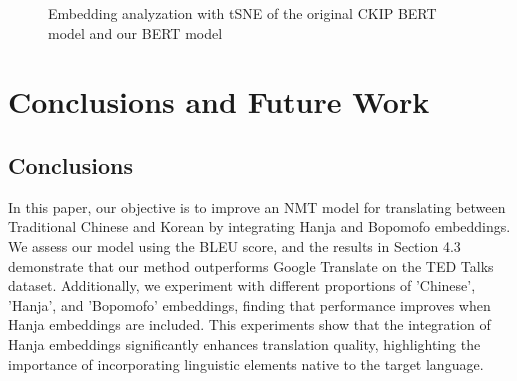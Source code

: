 \documentclass[PhD]{PHlab-thesis}
\begin{document}
\begin{figure}[h!]
  \centering
  \hfill
  \captionsetup{type=figure}
  \caption{Embedding analyzation with tSNE of the original CKIP BERT model and our BERT model}
  \label{fig:naver dictionary}
\end{figure}

\chapter{Conclusions and Future Work}
\section{Conclusions}
In this paper, our objective is to improve an NMT model for translating between Traditional Chinese and Korean by integrating Hanja and Bopomofo embeddings. We assess our model using the BLEU score, and the results in Section 4.3 demonstrate that our method outperforms Google Translate on the TED Talks dataset. Additionally, we experiment with different proportions of 'Chinese', 'Hanja', and 'Bopomofo' embeddings, finding that performance improves when Hanja embeddings are included. This experiments show that the integration of Hanja embeddings significantly enhances translation quality, highlighting the importance of incorporating linguistic elements native to the target language.
\end{document}

